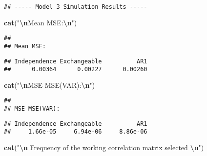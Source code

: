 \documentclass[
]{article}
\newenvironment{Shaded}{\begin{snugshade}}{\end{snugshade}}
\newcommand{\FunctionTok}[1]{\textcolor[rgb]{0.13,0.29,0.53}{\textbf{#1}}}
\newcommand{\NormalTok}[1]{#1}
\newcommand{\SpecialCharTok}[1]{\textcolor[rgb]{0.81,0.36,0.00}{\textbf{#1}}}
\newcommand{\StringTok}[1]{\textcolor[rgb]{0.31,0.60,0.02}{#1}}
\begin{document}
\begin{verbatim}
## ----- Model 3 Simulation Results -----
\end{verbatim}

\begin{Shaded}
\begin{Highlighting}[]
\FunctionTok{cat}\NormalTok{(}\StringTok{"}\SpecialCharTok{\textbackslash{}n}\StringTok{Mean MSE:}\SpecialCharTok{\textbackslash{}n}\StringTok{"}\NormalTok{)}
\end{Highlighting}
\end{Shaded}

\begin{verbatim}
## 
## Mean MSE:
\end{verbatim}

\begin{Shaded}
\end{Shaded}

\begin{verbatim}
## Independence Exchangeable          AR1 
##      0.00364      0.00227      0.00260
\end{verbatim}

\begin{Shaded}
\begin{Highlighting}[]
\FunctionTok{cat}\NormalTok{(}\StringTok{"}\SpecialCharTok{\textbackslash{}n}\StringTok{MSE MSE(VAR):}\SpecialCharTok{\textbackslash{}n}\StringTok{"}\NormalTok{)}
\end{Highlighting}
\end{Shaded}

\begin{verbatim}
## 
## MSE MSE(VAR):
\end{verbatim}

\begin{Shaded}
\end{Shaded}

\begin{verbatim}
## Independence Exchangeable          AR1 
##     1.66e-05     6.94e-06     8.86e-06
\end{verbatim}

\begin{Shaded}
\begin{Highlighting}[]
\FunctionTok{cat}\NormalTok{(}\StringTok{"}\SpecialCharTok{\textbackslash{}n}\StringTok{ Frequency of the working correlation matrix selected }\SpecialCharTok{\textbackslash{}n}\StringTok{"}\NormalTok{)}
\end{Highlighting}
\end{Shaded}
\end{document}
